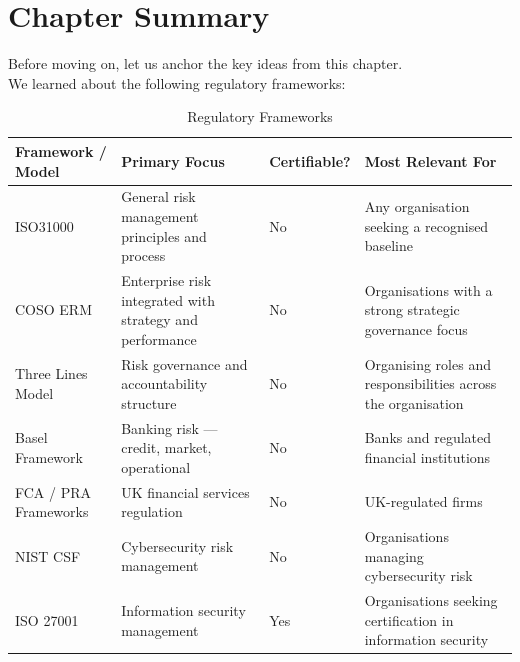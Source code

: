 \section{Chapter Summary}
Before moving on, let us anchor the key ideas from this chapter.\\
We learned about the following regulatory frameworks:
\begin{table}[H]
  \centering
  \renewcommand{\arraystretch}{1.5}
  \begin{tabularx}{\textwidth}{ | >{\raggedright\arraybackslash}p{} 
                                | >{\raggedright\arraybackslash}p{} 
                                | >{\raggedright\arraybackslash}p{} 
                                | >{\raggedright\arraybackslash}X | }
    \hline
    \textbf{Framework / Model} & \textbf{Primary Focus} & \textbf{Certifiable?} & \textbf{Most Relevant For} \\
    \hline
    ISO31000 & General risk management principles and process & No & Any organisation seeking a recognised baseline \\
    \hline
    COSO ERM & Enterprise risk integrated with strategy and performance & No & Organisations with a strong strategic governance focus\\
    \hline
    Three Lines Model & Risk governance and accountability structure & No & Organising roles and responsibilities across the organisation\\
    \hline
    Basel Framework & Banking risk — credit, market, operational & No & Banks and regulated financial institutions\\
    \hline
    FCA / PRA Frameworks & UK financial services regulation & No & UK-regulated firms\\
    \hline
    NIST CSF & Cybersecurity risk management & No & Organisations managing cybersecurity risk\\
    \hline
    ISO 27001 & Information security management & Yes & Organisations seeking certification in information security\\
    \hline
  \end{tabularx}
  \caption{Regulatory Frameworks}
\end{table}

